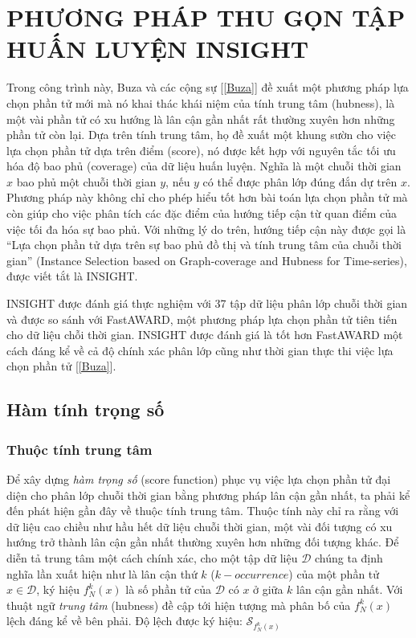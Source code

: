 \documentclass[13pt,oneside]{scrbook}
\begin{document}
\section{PHƯƠNG PHÁP THU GỌN TẬP HUẤN LUYỆN INSIGHT}
Trong công trình này, Buza và các cộng sự [\ref{Buza}] đề xuất một phương pháp lựa chọn phần tử mới mà nó khai thác khái niệm của tính trung tâm (hubness), là một vài phần tử có xu hướng là lân cận gần nhất rất thường xuyên hơn những phần tử còn lại. 
Dựa trên tính trung tâm, họ đề xuất một khung sườn cho việc lựa chọn phần tử dựa trên điểm (score), nó được kết hợp với nguyên tắc tối ưu hóa độ bao phủ (coverage) của dữ liệu huấn luyện. 
Nghĩa là một chuỗi thời gian $x$ bao phủ một chuỗi thời gian $y$, nếu $y$ có thể được phân lớp đúng đắn dự trên $x$. 
Phương pháp này không chỉ cho phép hiểu tốt hơn bài toán lựa chọn phần tử mà còn giúp cho việc phân tích các đặc điểm của hướng tiếp cận từ quan điểm của việc tối đa hóa sự bao phủ. 
Với những lý do trên, hướng tiếp cận này được gọi là “Lựa chọn phần tử dựa trên sự bao phủ đồ thị và  tính trung tâm của chuỗi thời gian” (Instance Selection based on Graph-coverage and Hubness for Time-series), được viết tắt là INSIGHT.

INSIGHT được đánh giá thực nghiệm với 37 tập dữ liệu phân lớp chuỗi thời gian và được so sánh với FastAWARD, một phương pháp lựa chọn phần tử tiên tiến cho dữ liệu chỗi thời gian. 
INSIGHT được đánh giá là tốt hơn FastAWARD một cách đáng kể về cả độ chính xác phân lớp cũng như thời gian thực thi việc lựa chọn phần tử [\ref{Buza}].
\subsection{Hàm tính trọng số}

\subsubsection{Thuộc tính trung tâm}
Để xây dựng \textit{hàm trọng số} (score function) phục vụ việc lựa chọn phần tử đại diện cho phân lớp chuỗi thời gian bằng phương pháp lân cận gần nhất, ta phải kể đến phát hiện gần đây về thuộc tính trung tâm. 
Thuộc tính này chỉ ra rằng với dữ liệu cao chiều như hầu hết dữ liệu chuỗi thời gian, một vài đối tượng có xu hướng trở thành lân cận gần nhất thường xuyên hơn những đối tượng khác. 
Để diễn tả trung tâm một cách chính xác, cho một tập dữ liệu $\mathscr{D}$ chúng ta định nghĩa lần xuất hiện như là lân cận thứ $k$ ($k-occurrence$) của một phần tử $x \in \mathscr{D}$, ký hiệu $f^k_N(x)$ là số phần tử của $\mathscr{D}$ có $x$ ở giữa $k$ lân cận gần nhất. 
Với thuật ngữ \textit{trung tâm} (hubness) đề cập tới hiện tượng mà phân bố của $f^k_N(x)$  lệch đáng kể về bên phải. Độ lệch được ký hiệu: $\mathscr{S}_{f^k_N(x)}$
\end{document}
